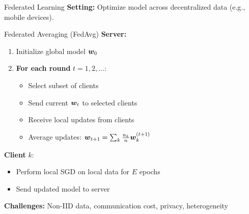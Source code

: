 \documentclass[aspectratio=169]{beamer}
\begin{document}
\begin{frame}{Federated Learning}
  \textbf{Setting:} Optimize model across decentralized data (e.g., mobile devices).

  \vspace{0.5em}

  \begin{examplebox}{Federated Averaging (FedAvg)}
    \textbf{Server:}
    \begin{enumerate}
      \item Initialize global model $\boldsymbol{w}_0$
      \item \textbf{For each round} $t = 1, 2, \ldots$:
      \begin{itemize}
        \item Select subset of clients
        \item Send current $\boldsymbol{w}_t$ to selected clients
        \item Receive local updates from clients
        \item Average updates: $\boldsymbol{w}_{t+1} = \sum_k \frac{n_k}{n} \boldsymbol{w}_k^{(t+1)}$
      \end{itemize}
    \end{enumerate}

    \textbf{Client} $k$:
    \begin{itemize}
      \item Perform local SGD on local data for $E$ epochs
      \item Send updated model to server
    \end{itemize}
  \end{examplebox}

  \vspace{0.5em}

  \textbf{Challenges:} Non-IID data, communication cost, privacy, heterogeneity
\end{frame}
\end{document}
